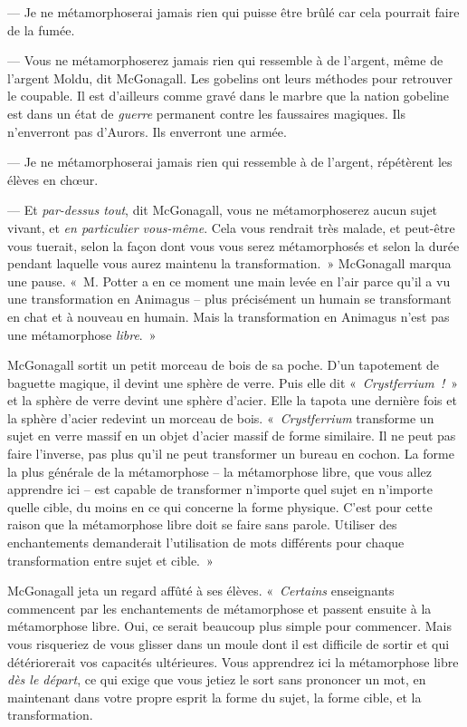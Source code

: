 --- Je ne métamorphoserai jamais rien qui puisse être brûlé car cela pourrait faire de la fumée.

--- Vous ne métamorphoserez jamais rien qui ressemble à de l'argent, même de l'argent Moldu, dit McGonagall.
Les gobelins ont leurs méthodes pour retrouver le coupable.
Il est d'ailleurs comme gravé dans le marbre que la nation gobeline est dans un état de \emph{guerre} permanent contre les faussaires magiques.
Ils n'enverront pas d'Aurors.
Ils enverront une armée.

--- Je ne métamorphoserai jamais rien qui ressemble à de l'argent, répétèrent les élèves en chœur.

--- Et \emph{par-dessus tout}, dit McGonagall, vous ne métamorphoserez aucun sujet vivant, et \emph{en particulier vous-même}.
Cela vous rendrait très malade, et peut-être vous tuerait, selon la façon dont vous vous serez métamorphosés et selon la durée pendant laquelle vous aurez maintenu la transformation.~»
McGonagall marqua une pause. «~M. Potter a en ce moment une main levée en l'air parce qu'il a vu une transformation en Animagus -- plus précisément un humain se transformant en chat et à nouveau en humain.
Mais la transformation en Animagus n'est pas une métamorphose \emph{libre}.~»

McGonagall sortit un petit morceau de bois de sa poche.
D'un tapotement de baguette magique, il devint une sphère de verre.
Puis elle dit «~\emph{Crystferrium~!}~» et la sphère de verre devint une sphère d'acier.
Elle la tapota une dernière fois et la sphère d'acier redevint un morceau de bois.
«~\emph{Crystferrium} transforme un sujet en verre massif en un objet d'acier massif de forme similaire.
Il ne peut pas faire l'inverse, pas plus qu'il ne peut transformer un bureau en cochon.
La forme la plus générale de la métamorphose -- la métamorphose libre, que vous allez apprendre ici -- est capable de transformer n'importe quel sujet en n'importe quelle cible, du moins en ce qui concerne la forme physique.
C'est pour cette raison que la métamorphose libre doit se faire sans parole.
Utiliser des enchantements demanderait l'utilisation de mots différents pour chaque transformation entre sujet et cible.~»

McGonagall jeta un regard affûté à ses élèves.
«~\emph{Certains} enseignants commencent par les enchantements de métamorphose et passent ensuite à la métamorphose libre.
Oui, ce serait beaucoup plus simple pour commencer.
Mais vous risqueriez de vous glisser dans un moule dont il est difficile de sortir et qui détériorerait vos capacités ultérieures.
Vous apprendrez ici la métamorphose libre \emph{dès le départ}, ce qui exige que vous jetiez le sort sans prononcer un mot, en maintenant dans votre propre esprit la forme du sujet, la forme cible, et la transformation. %

